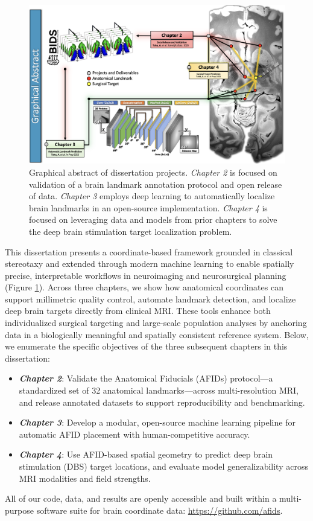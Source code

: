 \begin{figure}[hbt!]
    \centering
    \includegraphics[width=1\linewidth]{figs/ch1_Figure_Abstract2.png}
    \caption{Graphical abstract of dissertation projects. \textit{Chapter 2} is focused on validation of a brain landmark annotation protocol and open release of data. \textit{Chapter 3} employs deep learning to automatically localize brain landmarks in an open-source implementation. \textit{Chapter 4} is focused on leveraging data and models from prior chapters to solve the deep brain stimulation target localization problem.}
    \label{fig:Abstract}
\end{figure}
This dissertation presents a coordinate-based framework grounded in classical stereotaxy and extended through modern machine learning to enable spatially precise, interpretable workflows in neuroimaging and neurosurgical planning (Figure \ref{fig:Abstract}). Across three chapters, we show how anatomical coordinates can support millimetric quality control, automate landmark detection, and localize deep brain targets directly from clinical MRI. These tools enhance both individualized surgical targeting and large-scale population analyses by anchoring data in a biologically meaningful and spatially consistent reference system. Below, we enumerate the specific objectives of the three subsequent chapters in this dissertation: 

\begin{itemize}
\item \textbf{\textit{Chapter 2}}: Validate the Anatomical Fiducials (AFIDs) protocol—a standardized set of 32 anatomical landmarks—across multi-resolution MRI, and release annotated datasets to support reproducibility and benchmarking.
\item \textbf{\textit{Chapter 3}}: Develop a modular, open-source machine learning pipeline for automatic AFID placement with human-competitive accuracy.
\item \textbf{\textit{Chapter 4}}: Use AFID-based spatial geometry to predict deep brain stimulation (DBS) target locations, and evaluate model generalizability across MRI modalities and field strengths.
\end{itemize}
All of our code, data, and results are openly accessible and built within a multi-purpose software suite for brain coordinate data: \url{https://github.com/afids}.